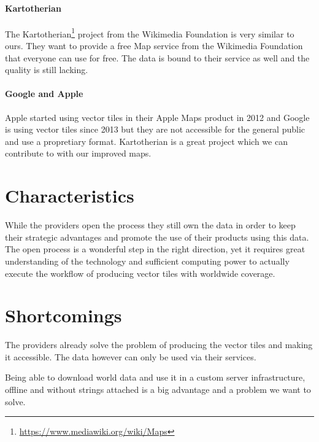 \paragraph{Kartotherian}

The Kartotherian\footnote{\url{https://www.mediawiki.org/wiki/Maps}} project from the Wikimedia Foundation is very similar to ours. They want to provide a free Map service from the Wikimedia Foundation that everyone can use for free. The data is bound to their service as well and the quality is still lacking.

\paragraph{Google and Apple}

Apple started using vector tiles in their Apple Maps product in 2012\cite{wiki:apple-maps}  and  Google is using vector tiles since 2013\cite{wiki:google-maps} but they are not accessible for the general public and use a propretiary format. Kartotherian is a great project which we can contribute to with
our improved maps.

\section{Characteristics}

While the providers open the process they still own the data in order to keep their strategic advantages and promote the use of their products using this data.
The open process is a wonderful step in the right direction, yet it requires great understanding
of the technology and sufficient computing power to actually
execute the workflow of producing vector tiles with worldwide coverage.

\section{Shortcomings}

The providers already solve the problem of producing the vector tiles
and making it accessible. The data however can only be used
via their services.

Being able to download world data and use it in a custom server
infrastructure, offline and without strings attached is a big advantage
and a problem we want to solve.

\newpage
